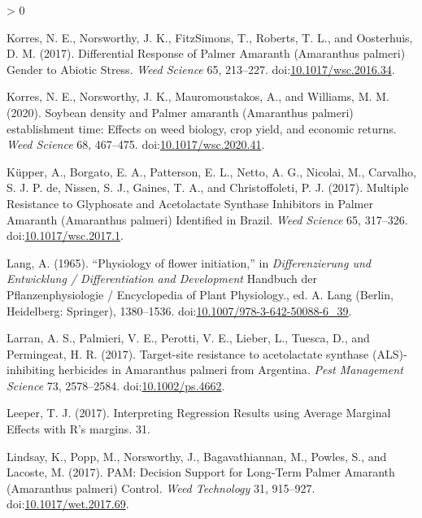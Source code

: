 \documentclass[utf8]{frontiersSCNS}
\newlength{\cslhangindent}
\newenvironment{CSLReferences}[2] %
 {%
  \setlength{\parindent}{0pt}
  \ifodd #1 \everypar{\setlength{\hangindent}{\cslhangindent}}\ignorespaces\fi
  \ifnum #2 > 0
  \setlength{\parskip}{#2\baselineskip}
  \fi
 }%
 {}
\begin{document}
\begin{CSLReferences}{1}{0}
\leavevmode\hypertarget{ref-korres2017}{}%
Korres, N. E., Norsworthy, J. K., FitzSimons, T., Roberts, T. L., and
Oosterhuis, D. M. (2017). Differential {Response} of {Palmer Amaranth}
({Amaranthus} palmeri) {Gender} to {Abiotic Stress}. \emph{Weed Science}
65, 213--227.
doi:\href{https://doi.org/10.1017/wsc.2016.34}{10.1017/wsc.2016.34}.

\leavevmode\hypertarget{ref-korres2020}{}%
Korres, N. E., Norsworthy, J. K., Mauromoustakos, A., and Williams, M.
M. (2020). Soybean density and {Palmer} amaranth ({Amaranthus} palmeri)
establishment time: Effects on weed biology, crop yield, and economic
returns. \emph{Weed Science} 68, 467--475.
doi:\href{https://doi.org/10.1017/wsc.2020.41}{10.1017/wsc.2020.41}.

\leavevmode\hypertarget{ref-kupper2017}{}%
Küpper, A., Borgato, E. A., Patterson, E. L., Netto, A. G., Nicolai, M.,
Carvalho, S. J. P. de, Nissen, S. J., Gaines, T. A., and Christoffoleti,
P. J. (2017). Multiple {Resistance} to {Glyphosate} and {Acetolactate
Synthase Inhibitors} in {Palmer Amaranth} ({Amaranthus} palmeri)
{Identified} in {Brazil}. \emph{Weed Science} 65, 317--326.
doi:\href{https://doi.org/10.1017/wsc.2017.1}{10.1017/wsc.2017.1}.

\leavevmode\hypertarget{ref-lang1965}{}%
Lang, A. (1965). {``Physiology of flower initiation,''} in
\emph{Differenzierung und {Entwicklung} / {Differentiation} and
{Development}} Handbuch der {Pflanzenphysiologie} / {Encyclopedia} of
{Plant Physiology}., ed. A. Lang ({Berlin, Heidelberg}: {Springer}),
1380--1536.
doi:\href{https://doi.org/10.1007/978-3-642-50088-6_39}{10.1007/978-3-642-50088-6\_39}.

\leavevmode\hypertarget{ref-larran2017}{}%
Larran, A. S., Palmieri, V. E., Perotti, V. E., Lieber, L., Tuesca, D.,
and Permingeat, H. R. (2017). Target-site resistance to acetolactate
synthase ({ALS})-inhibiting herbicides in {Amaranthus} palmeri from
{Argentina}. \emph{Pest Management Science} 73, 2578--2584.
doi:\href{https://doi.org/10.1002/ps.4662}{10.1002/ps.4662}.

\leavevmode\hypertarget{ref-leeper2017}{}%
Leeper, T. J. (2017). Interpreting {Regression Results} using {Average
Marginal Eﬀects} with {R}'s margins. 31.

\leavevmode\hypertarget{ref-lindsay2017}{}%
Lindsay, K., Popp, M., Norsworthy, J., Bagavathiannan, M., Powles, S.,
and Lacoste, M. (2017). {PAM}: {Decision Support} for {Long}-{Term
Palmer Amaranth} ({Amaranthus} palmeri) {Control}. \emph{Weed
Technology} 31, 915--927.
doi:\href{https://doi.org/10.1017/wet.2017.69}{10.1017/wet.2017.69}.


\end{CSLReferences}
\end{document}
